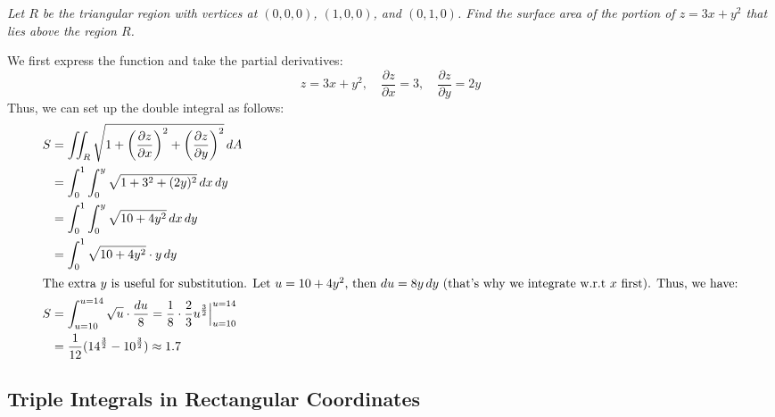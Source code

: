 \documentclass[11pt]{report}
\begin{document}
\begin{example}
    \textit{Let $R$ be the triangular region with vertices at $(0,0,0)$, $(1,0,0)$, and $(0,1,0)$. Find the surface area of the portion of $z = 3x + y^2$ that lies above the region $R$.}
    
    We first express the function and take the partial derivatives:
    $$
        z = 3x + y^2, \quad \frac{\partial z}{\partial x} = 3, \quad \frac{\partial z}{\partial y} = 2y
    $$
    Thus, we can set up the double integral as follows:
    \begin{align*}
        S &= \iint_R \sqrt{1 + \left( \frac{\partial z}{\partial x} \right)^2 + \left( \frac{\partial z}{\partial y} \right)^2} \, dA \\
        &= \int_0^1 \int_0^{y} \sqrt{1 + 3^2 + (2y)^2} \, dx \, dy \\
        &= \int_0^1 \int_0^{y} \sqrt{10 + 4y^2} \, dx \, dy \\
        &= \int_0^1 \sqrt{10 + 4y^2} \cdot y \, dy \\ 
        \intertext{The extra $y$ is useful for substitution. Let $u = 10 + 4y^2$, then $du = 8y \, dy$ (that's why we integrate w.r.t $x$ first). Thus, we have:}
        S &= \int_{u=10}^{u=14} \sqrt{u} \cdot \frac{du}{8} = \frac{1}{8} \cdot \frac{2}{3} u^{\frac{3}{2}} \Big|_{u=10}^{u=14} \\ 
        &= \frac{1}{12} (14^{\frac{3}{2}} - 10^{\frac{3}{2}}) \approx 1.7
    \end{align*}
\end{example}


\subsection{Triple Integrals in Rectangular Coordinates}
\end{document}
